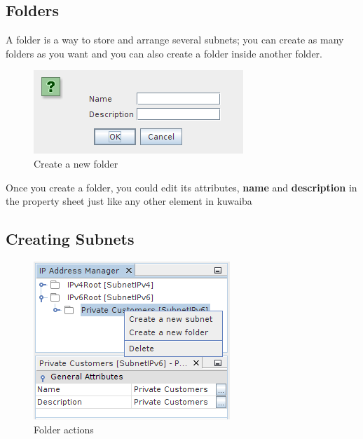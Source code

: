 \documentclass[a4paper]{article}
\begin{document}
		\subsection{Folders}
		A folder is a way to store and arrange several subnets; you can create as many folders as you want and you can also create a folder inside another folder.
		\begin{figure}[h!]
			\centering
			\includegraphics[width=0.4\linewidth]{img/ipam_create_new_folder.png}
			\caption{Create a new folder}
			\label{fig:ipam_create_new_folder}
		\end{figure}
		
		Once you create a folder, you could edit its attributes, \textbf{name} and \textbf{description} in the property sheet just like any other element in kuwaiba

		\subsection{Creating Subnets}
		\begin{figure}[h!]
			\centering
			\includegraphics[width=0.4\linewidth]{img/ipam_folder_actions.png}
			\caption{Folder actions}
			\label{fig:ipam_folder_actions}
		\end{figure}
	
\end{document}
